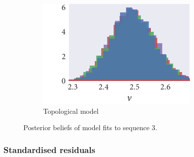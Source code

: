 \begin{figure}[p]
\begin{subfigure}[b]{\textwidth}
    \includegraphics{seq3/top_hist_nu.pdf}%
    \caption{Topological model}
  \end{subfigure}
  \caption{Posterior beliefs of model fits to sequence $3$.}
\end{figure}

\subsubsection{Standardised residuals}

